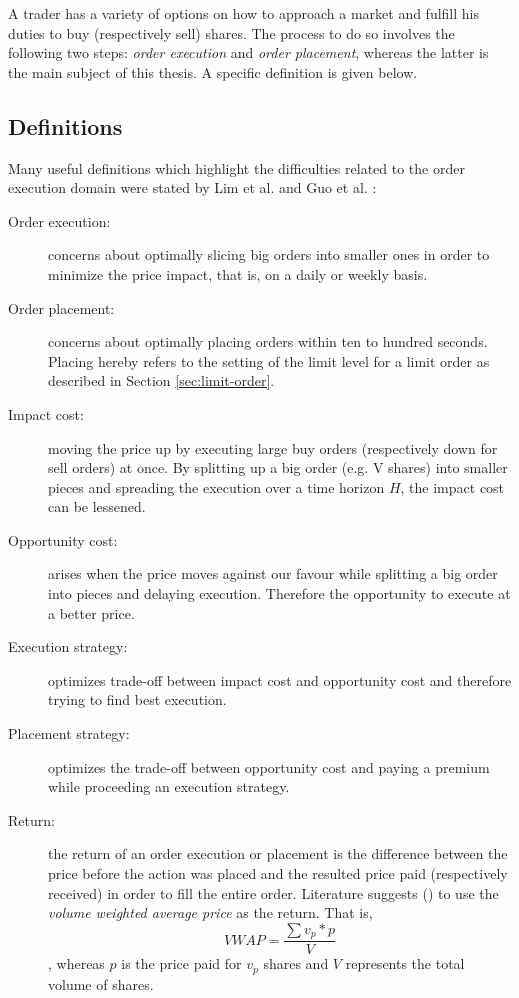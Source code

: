 A trader has a variety of options on how to approach a market and fulfill his duties to buy (respectively sell) shares.
The process to do so involves the following two steps: \textit{order execution} and \textit{order placement}, whereas the latter is the main subject of this thesis.
A specific definition is given below.

\subsection{Definitions}
\label{sec:execution-definition}

Many useful definitions which highlight the difficulties related to the order execution domain were stated by Lim et al. \cite{lim2005optimal} and Guo et al. \cite{guo2013optimal}:
\begin{description}
    \item[Order execution:] concerns about optimally slicing big orders into smaller ones in order to minimize the price impact, that is, on a daily or weekly basis.
    \item[Order placement: ] concerns about optimally placing orders within ten to hundred seconds.
    Placing hereby refers to the setting of the limit level for a limit order as described in Section \ref{sec:limit-order}.
    \item[Impact cost:] moving the price up by executing large buy orders (respectively down for sell orders) at once. 
    By splitting up a big order (e.g. V shares) into smaller pieces and spreading the execution over a time horizon $H$, the impact cost can be lessened.
    \item[Opportunity cost:] arises when the price moves against our favour while splitting a big order into pieces and delaying execution. 
    Therefore the opportunity to execute at a better price.
    \item[Execution strategy:] optimizes trade-off between impact cost and opportunity cost and therefore trying to find best execution.
    
    \item[Placement strategy:] optimizes the trade-off between opportunity cost and paying a premium while proceeding an execution strategy.
    
    \item[Return:] the return of an order execution or placement is the difference between the price before the action was placed and the resulted price paid (respectively received) in order to fill the entire order.
    Literature suggests (\cite{nevmyvaka2006reinforcement}) to use the \textit{volume weighted average price} as the return.
    That is,
    \begin{equation}\label{eq:vwap}
        VWAP=\frac{\sum{v_p*p}}{V}
    \end{equation}
    , whereas $p$ is the price paid for $v_p$ shares and $V$ represents the total volume of shares.
    
\end{description}

